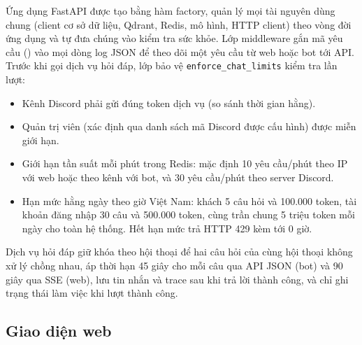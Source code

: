 Ứng dụng FastAPI được tạo bằng hàm factory, quản lý mọi tài nguyên dùng chung (client cơ sở dữ liệu, Qdrant, Redis, mô hình, HTTP client) theo vòng đời ứng dụng và tự đưa chúng vào kiểm tra sức khỏe. Lớp middleware gắn mã yêu cầu () vào mọi dòng log JSON để theo dõi một yêu cầu từ web hoặc bot tới API. Trước khi gọi dịch vụ hỏi đáp, lớp bảo vệ \nolinkurl{enforce_chat_limits} kiểm tra lần lượt:
\begin{itemize}
    \item Kênh Discord phải gửi đúng token dịch vụ (so sánh thời gian hằng).
    \item Quản trị viên (xác định qua danh sách mã Discord được cấu hình) được miễn giới hạn.
    \item Giới hạn tần suất mỗi phút trong Redis: mặc định 10 yêu cầu/phút theo IP với web hoặc theo kênh với bot, và 30 yêu cầu/phút theo server Discord.
    \item Hạn mức hằng ngày theo giờ Việt Nam: khách 5 câu hỏi và 100.000 token, tài khoản đăng nhập 30 câu và 500.000 token, cùng trần chung 5 triệu token mỗi ngày cho toàn hệ thống. Hết hạn mức trả HTTP 429 kèm  tới 0 giờ.
\end{itemize}
Dịch vụ hỏi đáp giữ khóa theo hội thoại để hai câu hỏi của cùng hội thoại không xử lý chồng nhau, áp thời hạn 45 giây cho mỗi câu qua API JSON (bot) và 90 giây qua SSE (web), lưu tin nhắn và trace sau khi trả lời thành công, và chỉ ghi trạng thái làm việc khi lượt thành công.

\subsection{Giao diện web}
\label{sec:impl_web_ui}

